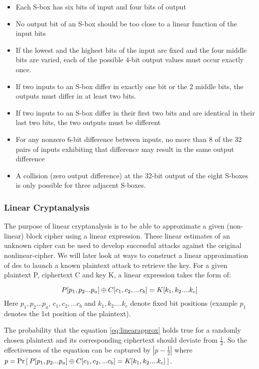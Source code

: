 \begin{itemize}
\item Each S-box has six bits of input and four bits of output
\item No output bit of an S-box should be too close to a linear function of the input bits
\item If the lowest and the highest bits of the input are fixed and the four middle bits are varied, each of the possible 4-bit output values must occur exactly once.
\item If two inputs to an S-box differ in exactly one bit or the 2 middle bits, the outputs must differ in at least two bits. 
\item If two inputs to an S-box differ in their first two bits and are identical in their last two bits, the two outputs must be different
\item For any nonzero 6-bit difference between inputs, no more than 8 of the 32 pairs of inputs exhibiting that difference may result in the same output difference
\item A collision (zero output difference) at the 32-bit output of the eight S-boxes is only possible for three adjacent S-boxes.
\end{itemize}

\subsubsection*{Linear Cryptanalysis} The purpose of linear cryptanalysis is to be able to approximate a given (non-linear) block cipher using a linear expression. These linear estimates of an unknown cipher can be used to develop successful attacks against the original nonlinear-cipher. We will later look at ways to construct a linear approximation of des to launch a known plaintext attack to retrieve the key. \newline
For a given plaintext P, ciphertext C and key K, a linear expression takes the form of: \newline

\begin{equation}
 P[p_1, p_2 ... p_a] {\:\oplus\:} C[c_1, c_2, ... c_b] = K[k_1, k_2 .... k_c] \label{eq:linearapprox}
\end{equation}
Here $p_1, p_2 ... p_a$, $c_1, c_2, ... c_b$ and $k_1, k_2 .... k_c$ denote fixed bit positions (example $p_1$ denotes the 1st position of the plaintext). \newline

The probability that the equation \eqref{eq:linearapprox} holds true for a randomly chosen plaintext and its corresponding ciphertext should deviate from $\frac{1}{2}$. So the effectiveness of the equation can be captured by \( |p - \frac{1}{2}|\) where \( p = \Pr\left[\: P[p_1, p_2 ... p_a] {\:\oplus\:} C[c_1, c_2, ... c_b] = K[k_1, k_2 .... k_c] \:\right]\). \newline

